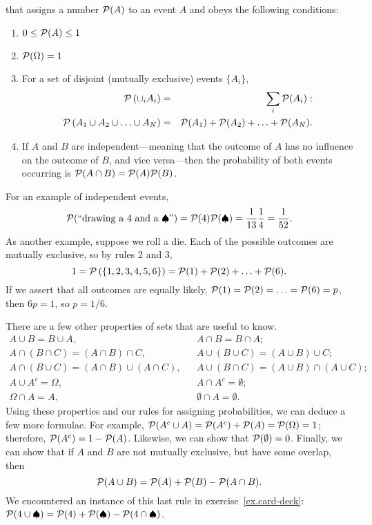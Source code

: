  that assigns a number $\mathcal{P}(A)$ to an event $A$ and obeys the following conditions:
\begin{enumerate}
\item $0\le\mathcal{P}(A) \le 1$
\item $\mathcal{P}(\Omega) = 1$
\item For a set of disjoint (mutually exclusive) events $\{A_{i}\}$,
\begin{eqnarray*}
 \mathcal{P}\left(\cup_{i}A_{i}\right) &=& \sum_{i}\mathcal{P}(A_{i}):\\
 \mathcal{P}\left(A_{1}\cup A_{2}\cup\ldots\cup A_{N}\right) &=&
 	\mathcal{P}(A_{1})+\mathcal{P}(A_{2}) +\ldots+\mathcal{P}(A_{N}).
\end{eqnarray*}
\item If $A$ and $B$ are independent---meaning that the outcome of $A$ has no influence on the outcome of $B$, and vice versa---then the probability of both events occurring is $\mathcal{P}(A\cap B) = \mathcal{P}(A)\mathcal{P}(B)$.
\end{enumerate}
For an example of independent events,
\[
 \mathcal{P}(\textrm{``drawing a 4 and a $\spadesuit$''}) = \mathcal{P}(4)\mathcal{P}(\spadesuit) = \frac{1}{13}\frac{1}{4} = \frac{1}{52}.
 \]
As another example, suppose we roll a die. Each of the possible outcomes are mutually exclusive, so by rules 2 and 3,
\[
	1 = \mathcal{P}\left(\{1,2,3,4,5,6\}\right) = \mathcal{P}(1) + \mathcal{P}(2) +\ldots+\mathcal{P}(6).
\]
If we assert that all outcomes are equally likely, $\mathcal{P}(1)=\mathcal{P}(2)=\ldots=\mathcal{P}(6)=p$, then $6p = 1$, so $p = 1/6$.

There are a few other properties of sets that are useful to know.
\begin{eqnarray*}
	A\cup B = B\cup A, && A\cap B = B\cap A;\\
	A\cap(B\cap C) = (A\cap B)\cap C, && A\cup(B\cup C) = (A\cup B)\cup C;\\
	A\cap(B\cup C) = (A\cap B)\cup(A\cap C), && A\cup(B\cap C) = (A\cup B)\cap(A\cup C);\\
	A\cup A^{c} = \Omega, && A\cap A^{c} = \emptyset;\\
	\Omega\cap A = A, && \emptyset\cap A = \emptyset.
\end{eqnarray*}
Using these properties and our rules for assigning probabilities, we can deduce a few more formulae. For example, $\mathcal{P}(A^{c}\cup A) =  \mathcal{P}(A^{c}) + \mathcal{P}(A) = \mathcal{P}(\Omega) = 1$; therefore, $\mathcal{P}(A^{c}) = 1-\mathcal{P}(A)$.  Likewise, we can show that $\mathcal{P}(\emptyset)=0$.  
Finally, we can show that if $A$ and $B$ are not mutually exclusive, but have some overlap, then
\[ \mathcal{P}(A\cup B) = \mathcal{P}(A)+\mathcal{P}(B) - \mathcal{P}(A\cap B). \]
We encountered an instance of this last rule in exercise~\ref{ex.card-deck}: $\mathcal{P}(4\cup\spadesuit) = \mathcal{P}(4)+\mathcal{P}(\spadesuit) - \mathcal{P}(4\cap\spadesuit)$.

